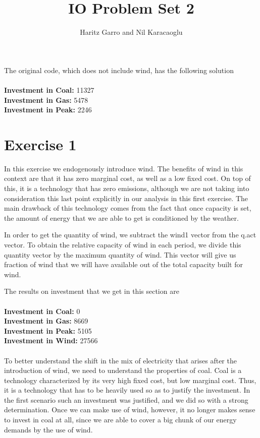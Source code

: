 \documentclass[12 pt]{article}
\title{IO Problem Set 2}
\author{Haritz Garro and Nil Karacaoglu}
\begin{document}
\maketitle

The original code, which does not include wind, has the following solution \\
\\
\textbf{Investment in Coal:} 11327 \\
\textbf{Investment in Gas:}  5478  \\
\textbf{Investment in Peak:} 2246


\section*{Exercise 1}

In this exercise we endogenously introduce wind. The benefits of wind in this context are that it has zero marginal cost, as well as a low fixed cost. On top of this, it is a technology that has zero emissions, although we are not taking into consideration this last point explicitly in our analysis in this first exercise. The main drawback of this technology comes from the fact that once capacity is set, the amount of energy that we are able to get is conditioned by the weather. 

In order to get the quantity of wind, we subtract the wind1 vector from the q.act vector. To obtain the relative capacity of wind in each period, we divide this quantity vector by the maximum quantity of wind. This vector will give us fraction of wind that we will have available out of the total capacity built for wind. 

The results on investment that we get in this section are \\
\\
\textbf{Investment in Coal:} 0 \\
\textbf{Investment in Gas:}  8669  \\
\textbf{Investment in Peak:} 5105 \\
\textbf{Investment in Wind:} 27566 \\
\\

To better understand the shift in the mix of electricity that arises after the introduction of wind, we need to understand the properties of coal. Coal is a technology characterized by its very high fixed cost, but low marginal cost. Thus, it is a technology that has to be heavily used so as to justify the investment. In the first scenario such an investment was justified, and we did so with a strong determination. Once we can make use of wind, however, it no longer makes sense to invest in coal at all, since we are able to cover a big chunk of our energy demands by the use of wind.
\end{document}
